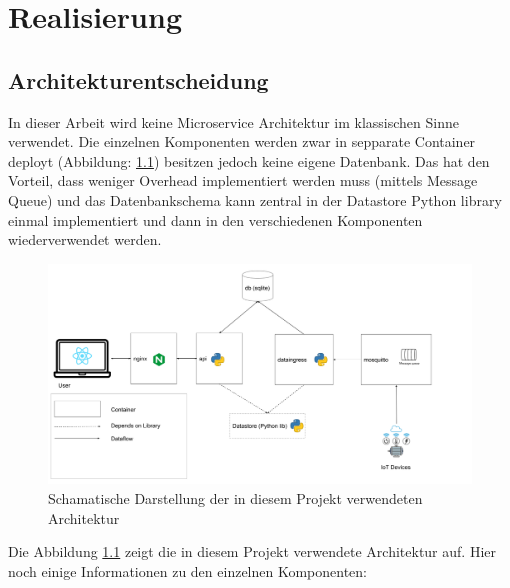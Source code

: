 \chapter{Realisierung}

\section{Architekturentscheidung}

In dieser Arbeit wird keine Microservice Architektur im klassischen Sinne verwendet.
Die einzelnen Komponenten werden zwar in sepparate Container deployt (Abbildung: \ref{fig:smic-arch})
besitzen jedoch keine eigene Datenbank.
Das hat den Vorteil, dass weniger Overhead implementiert werden muss (mittels Message Queue)
und das Datenbankschema kann zentral in der Datastore Python library einmal implementiert
und dann in den verschiedenen Komponenten wiederverwendet werden.


\begin{figure}[h]
    \centering
    \includegraphics[width=1.0\textwidth]{gfx/smic-arch}
    \caption{
        Schamatische Darstellung der in diesem Projekt verwendeten Architektur
    }
    \label{fig:smic-arch}
\end{figure}

Die Abbildung \ref{fig:smic-arch} zeigt die in diesem Projekt verwendete
Architektur auf. Hier noch einige Informationen zu den einzelnen Komponenten:


